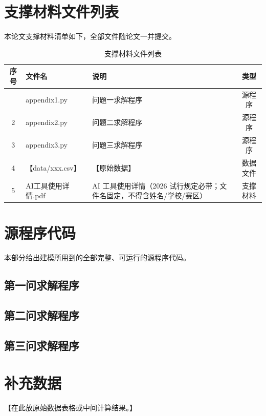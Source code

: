 \documentclass[withoutpreface,bwprint]{cumcmthesis}
\begin{document}
\begin{appendices}
    \section{支撑材料文件列表}

    本论文支撑材料清单如下，全部文件随论文一并提交。

    {\renewcommand{\arraystretch}{1.38}
    \setlength{\tabcolsep}{6pt}
    \begin{longtable}{cllc}
        \caption{支撑材料文件列表}\\
        \toprule[1.5pt]
        序号 & 文件名 & 说明 & 类型 \\
        \midrule[1pt]
        \endfirsthead
        \endhead
        \bottomrule[1.5pt]
        \endlastfoot
        1 & appendix1.py & 问题一求解程序 & 源程序 \\
        2 & appendix2.py & 问题二求解程序 & 源程序 \\
        3 & appendix3.py & 问题三求解程序 & 源程序 \\
        4 & 【data/xxx.csv】 & 【原始数据】 & 数据文件 \\
        5 & AI工具使用详情.pdf & AI 工具使用详情（2026 试行规定必带；文件名固定，不得含姓名/学校/赛区） & 支撑材料 \\
    \end{longtable}}

    \section{源程序代码}

    本部分给出建模所用到的全部完整、可运行的源程序代码。

    \subsection{第一问求解程序}
    

    \subsection{第二问求解程序}
    

    \subsection{第三问求解程序}
    

    \section{补充数据}

    【在此放原始数据表格或中间计算结果。】

\end{appendices}
\end{document}
